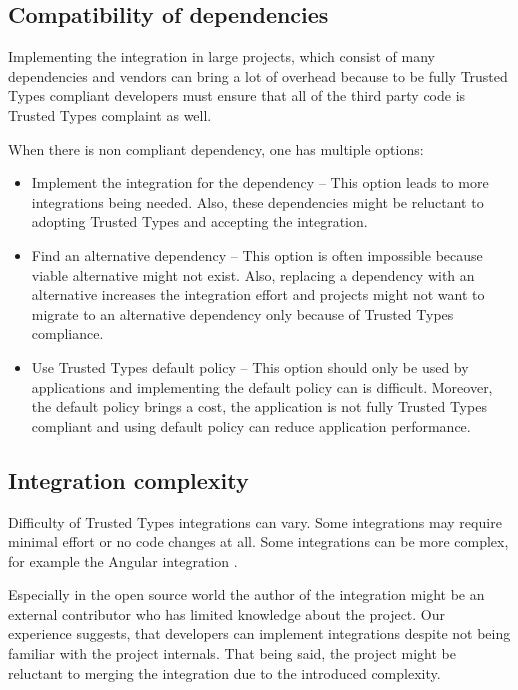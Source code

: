 \subsection{Compatibility of dependencies}
\label{sub:tt_compatibility_in_deps}

Implementing the integration in large projects, which consist of many dependencies and vendors can
bring a lot of overhead because to be fully Trusted Types compliant developers must ensure that all
of the third party code is Trusted Types complaint as well.

When there is non compliant dependency, one has multiple options:

\begin{itemize}
  \item Implement the integration for the dependency -- This option leads to more integrations being
        needed. Also, these dependencies might be reluctant to adopting Trusted Types and accepting
        the integration.
  \item Find an alternative dependency -- This option is often impossible because viable alternative
        might not exist. Also, replacing a dependency with an alternative increases the integration
        effort and projects might not want to migrate to an alternative dependency only because of
        Trusted Types compliance.
  \item Use Trusted Types default policy -- This option should only be used by applications and
        implementing the default policy can is difficult. Moreover, the default policy brings a
        cost, the application is not fully Trusted Types compliant and using default policy can
        reduce application performance.
\end{itemize}

\subsection{Integration complexity}
\label{sub:trust_integration_author}

Difficulty of Trusted Types integrations can vary. Some integrations may require minimal effort or
no code changes at all. Some integrations can be more complex, for example the Angular integration
\cite{tt_web_framework_paper}.

Especially in the open source world the author of the integration might be an external contributor
who has limited knowledge about the project. Our experience suggests, that developers can implement
integrations despite not being familiar with the project internals. That being said, the project
might be reluctant to merging the integration due to the introduced complexity.
